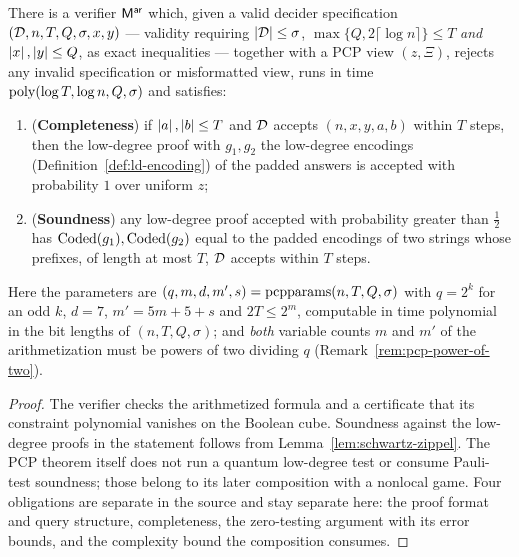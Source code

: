 \begin{theorem}
\label{thm:pcp-decider}
\leanok
There is a verifier $\mathsf{M}^{\mathsf{ar}}$ which, given a valid decider specification $(\mathcal{D},
n, T, Q, \sigma, x, y)$ --- validity requiring $\left\vert {\mathcal{D}} \right\vert \leq \sigma$, $\max\{Q,
2\lceil \log n \rceil\} \leq T$ \emph{and} $\left\vert {x} \right\vert, \left\vert {y} \right\vert \leq Q$, as exact inequalities
--- together with a PCP view $(z, \Xi)$, rejects any invalid specification or misformatted
view, runs in time $\mathrm{poly}(\log T, \log n, Q, \sigma)$ and satisfies:
\begin{enumerate}
\item (\textbf{Completeness}) if $\left\vert {a} \right\vert,\left\vert {b} \right\vert\leq T$ and $\mathcal{D}$ accepts
  $(n, x, y, a, b)$ within $T$ steps,
  then the low-degree proof with $g_1, g_2$ the low-degree encodings
  (Definition~\ref{def:ld-encoding}) of the padded answers
  is accepted with probability $1$ over uniform $z$;
\item (\textbf{Soundness}) any low-degree proof accepted with probability greater than
  $\frac12$ has $\mathrm{Coded}(g_1), \mathrm{Coded}(g_2)$ equal to the padded encodings of two strings whose
  prefixes, of length at most $T$, $\mathcal{D}$ accepts within $T$ steps.
\end{enumerate}
Here the parameters are $(q, m, d, m', s) = \mathrm{pcpparams}(n, T, Q, \sigma)$ with $q = 2^k$ for an
odd $k$, $d = 7$, $m' = 5m + 5 + s$ and $2T \leq 2^m$, computable in time polynomial in the
bit lengths of $(n, T, Q, \sigma)$; and \emph{both} variable counts $m$ and $m'$ of the
arithmetization must be powers of two dividing $q$ (Remark~\ref{rem:pcp-power-of-two}).
\end{theorem}

\begin{proof}
\leanok
The verifier checks the arithmetized formula and a certificate that its constraint
polynomial vanishes on the Boolean cube. Soundness against the low-degree proofs in the
statement follows from Lemma~\ref{lem:schwartz-zippel}. The PCP theorem itself does not run
a quantum low-degree test or consume Pauli-test soundness; those belong to its later
composition with a nonlocal game. Four obligations are separate in the source and stay separate here: the
proof format and query structure, completeness, the zero-testing argument with its error
bounds, and the complexity bound the composition consumes.
\end{proof}

